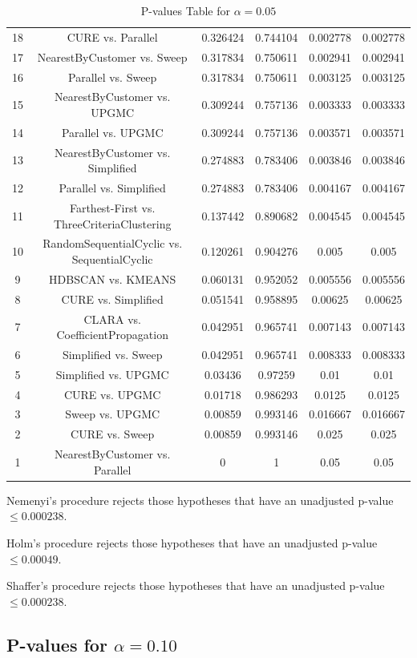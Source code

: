 \documentclass[a4paper,10pt]{article}
\begin{document}
\begin{landscape}
\begin{table}[!htp]
\begin{tabular}{cccccc}
18&CURE vs. Parallel&0.326424&0.744104&0.002778&0.002778\\
17&NearestByCustomer vs. Sweep&0.317834&0.750611&0.002941&0.002941\\
16&Parallel vs. Sweep&0.317834&0.750611&0.003125&0.003125\\
15&NearestByCustomer vs. UPGMC&0.309244&0.757136&0.003333&0.003333\\
14&Parallel vs. UPGMC&0.309244&0.757136&0.003571&0.003571\\
13&NearestByCustomer vs. Simplified&0.274883&0.783406&0.003846&0.003846\\
12&Parallel vs. Simplified&0.274883&0.783406&0.004167&0.004167\\
11&Farthest-First vs. ThreeCriteriaClustering&0.137442&0.890682&0.004545&0.004545\\
10&RandomSequentialCyclic vs. SequentialCyclic&0.120261&0.904276&0.005&0.005\\
9&HDBSCAN vs. KMEANS&0.060131&0.952052&0.005556&0.005556\\
8&CURE vs. Simplified&0.051541&0.958895&0.00625&0.00625\\
7&CLARA vs. CoefficientPropagation&0.042951&0.965741&0.007143&0.007143\\
6&Simplified vs. Sweep&0.042951&0.965741&0.008333&0.008333\\
5&Simplified vs. UPGMC&0.03436&0.97259&0.01&0.01\\
4&CURE vs. UPGMC&0.01718&0.986293&0.0125&0.0125\\
3&Sweep vs. UPGMC&0.00859&0.993146&0.016667&0.016667\\
2&CURE vs. Sweep&0.00859&0.993146&0.025&0.025\\
1&NearestByCustomer vs. Parallel&0&1&0.05&0.05\\
\hline
\end{tabular}
\caption{P-values Table for $\alpha=0.05$}
\end{table}Nemenyi's procedure rejects those hypotheses that have an unadjusted p-value $\le0.000238$.

Holm's procedure rejects those hypotheses that have an unadjusted p-value $\le0.00049$.

Shaffer's procedure rejects those hypotheses that have an unadjusted p-value $\le0.000238$.

\pagebreak

\subsection{P-values for $\alpha=0.10$}


\end{landscape}
\end{document}
